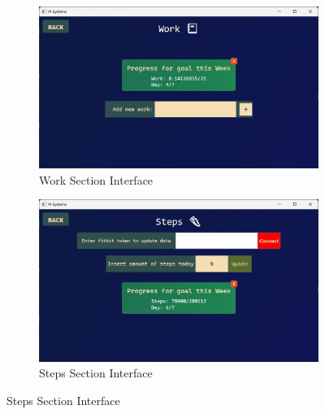 \documentclass[12pt]{article}
\begin{document}
\begin{figure}[!ht]
  \centering
  \begin{subfigure}{0.4\linewidth}
    \includegraphics[width = \linewidth]{Work Screen}
    \caption{Work Section Interface}
    \label{fig:Work}
  \end{subfigure}%
  \vspace{10pt}
  \hfill
  \begin{subfigure}{0.4\linewidth}
    \includegraphics[width = \linewidth]{Steps Screen}
    \caption{Steps Section Interface}
    \label{fig:Steps}
  \end{subfigure}


\end{figure}
\end{document}
